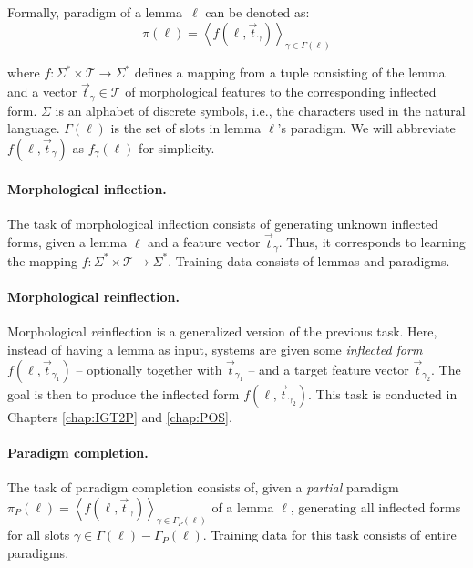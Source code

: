 Formally, paradigm of a lemma~$\ell$ can be denoted as:
\begin{equation}
    \pi(\ell) = \left\langle f(\ell, \vec{t}_\gamma)\right\rangle_{\gamma \in \Gamma(\ell)}
\end{equation}

\noindent where $f : \Sigma^* \times \mathcal{T} \to \Sigma^*$ defines a mapping from a tuple consisting of the lemma and a vector $\vec{t}_\gamma \in \mathcal{T}$ of morphological features to the corresponding inflected form. $\Sigma$ is an alphabet of discrete symbols, i.e., the characters used in the natural language. $\Gamma(\ell)$ is the set of slots in lemma $\ell$'s paradigm. 
We will abbreviate $f(\ell, \vec{t}_\gamma)$ as $f_{\gamma}(\ell)$ for simplicity.


\paragraph{Morphological inflection.}
The task of morphological inflection consists of generating unknown inflected forms, given a lemma 
$\ell$ and a feature vector $\vec{t}_\gamma$. Thus, it corresponds to learning the mapping $f : \Sigma^* \times \mathcal{T} \to \Sigma^*$. Training data consists of lemmas and paradigms.


\paragraph{Morphological reinflection. }
Morphological \textit{re}inflection is a generalized version of the previous task. Here, instead of having a lemma as input, systems are given some \textit{inflected form}  
$f(\ell, \vec{t}_{\gamma_1})$ -- optionally together with $\vec{t}_{\gamma_1}$ -- and a target feature vector $\vec{t}_{\gamma_2}$. The goal is then to produce the inflected form $f(\ell, \vec{t}_{\gamma_2})$. This task is conducted in Chapters \ref{chap:IGT2P} and \ref{chap:POS}.


\paragraph{Paradigm completion.}
The task of paradigm completion consists of, given a \textit{partial} paradigm $\pi_P(\ell) = \left\langle f(\ell, \vec{t}_\gamma)\right\rangle_{\gamma \in \Gamma_P(\ell)}$ of a lemma $\ell$, generating all inflected forms for all slots $\gamma \in \Gamma(\ell) - \Gamma_P(\ell)$.
Training data for this task consists of entire paradigms.

